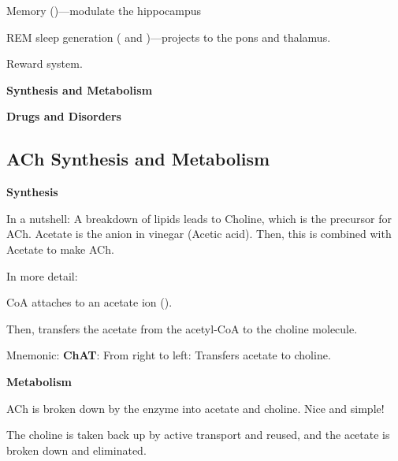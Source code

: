 \begin{coloredlist}
\begin{coloredlist}
\begin{coloredlist}
\begin{coloredlist}
\begin{coloredlist}
                \end{coloredlist}
                \item Memory ()---modulate the hippocampus
                \item REM sleep generation ( and )---projects to the pons and thalamus.
                \item Reward system.
            \end{coloredlist}
        \end{coloredlist}
    \end{coloredlist}
    \item \textbf{Synthesis and Metabolism}
    \item \textbf{Drugs and Disorders}
\end{coloredlist}

\subsection{ACh Synthesis and Metabolism}

\begin{coloredlist}
    \item \textbf{Synthesis}
    \begin{coloredlist}
        \item In a nutshell: A breakdown of lipids leads to Choline, which is the precursor for ACh. Acetate is the anion in vinegar (Acetic acid). Then, this is combined with Acetate to make ACh.
        \item In more detail:
        \begin{coloredlist}
            \item CoA attaches to an acetate ion ().
            \item Then,  transfers the acetate from the acetyl-CoA to the choline molecule.
            \item Mnemonic: \textbf{ChAT}: From right to left: Transfers acetate to choline.
        \end{coloredlist}
    \end{coloredlist}
    \item \textbf{Metabolism}
    \begin{coloredlist}
        \item ACh is broken down by the enzyme  into acetate and choline. Nice and simple!
        \item The choline is taken back up by active transport and reused, and the acetate is broken down and eliminated.
    \end{coloredlist}
\end{coloredlist}

